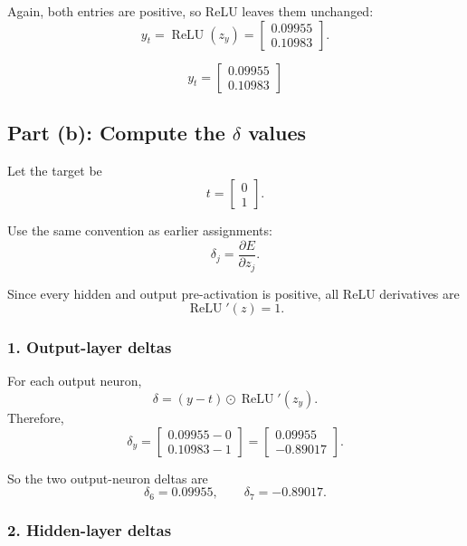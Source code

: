 \documentclass[11pt]{article}
\begin{document}
Again, both entries are positive, so ReLU leaves them unchanged:
\[
    y_t = \operatorname{ReLU}(z_y)
    =
    \begin{bmatrix}
        0.09955 \\
        0.10983
    \end{bmatrix}.
\]

\[
    \boxed{
    y_t=
    \begin{bmatrix}
        0.09955 \\
        0.10983
    \end{bmatrix}
    }
\]

\subsection*{Part (b): Compute the \(\delta\) values}

Let the target be
\[
    t=
    \begin{bmatrix}
        0 \\
        1
    \end{bmatrix}.
\]

Use the same convention as earlier assignments:
\[
    \delta_j = \frac{\partial E}{\partial z_j}.
\]

Since every hidden and output pre-activation is positive, all ReLU derivatives are
\[
    \operatorname{ReLU}'(z)=1.
\]

\subsubsection*{1. Output-layer deltas}

For each output neuron,
\[
    \delta = (y-t)\odot \operatorname{ReLU}'(z_y).
\]
Therefore,
\[
    \delta_y
    =
    \begin{bmatrix}
        0.09955-0 \\
        0.10983-1
    \end{bmatrix}
    =
    \begin{bmatrix}
        0.09955 \\
        -0.89017
    \end{bmatrix}.
\]

So the two output-neuron deltas are
\[
    \boxed{
    \delta_6=0.09955,\qquad
    \delta_7=-0.89017
    }.
\]

\subsubsection*{2. Hidden-layer deltas}
\end{document}
